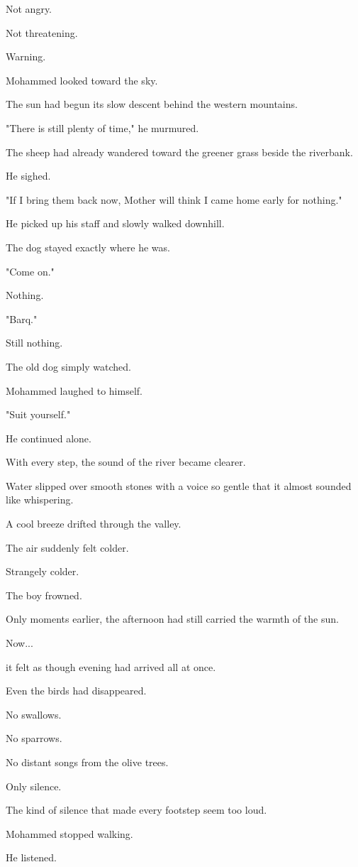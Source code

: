 \documentclass[12pt,openany]{book}
\begin{document}
Not angry.

Not threatening.

Warning.

Mohammed looked toward the sky.

The sun had begun its slow descent behind the western mountains.

"There is still plenty of time," he murmured.

The sheep had already wandered toward the greener grass beside the riverbank.

He sighed.

"If I bring them back now, Mother will think I came home early for nothing."

He picked up his staff and slowly walked downhill.

The dog stayed exactly where he was.

"Come on."

Nothing.

"Barq."

Still nothing.

The old dog simply watched.

Mohammed laughed to himself.

"Suit yourself."

He continued alone.

With every step, the sound of the river became clearer.

Water slipped over smooth stones with a voice so gentle that it almost sounded like whispering.

A cool breeze drifted through the valley.

The air suddenly felt colder.

Strangely colder.

The boy frowned.

Only moments earlier, the afternoon had still carried the warmth of the sun.

Now...

it felt as though evening had arrived all at once.

Even the birds had disappeared.

No swallows.

No sparrows.

No distant songs from the olive trees.

Only silence.

The kind of silence that made every footstep seem too loud.

Mohammed stopped walking.

He listened.
\end{document}
